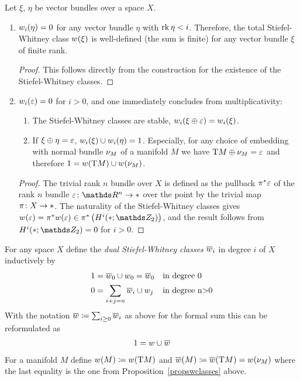 \begin{Rem} %
  \label{propswclasses}
  Let $\xi$, $\eta$ be vector bundles over a space $X$.
  \begin{enumerate} 
  \item $w_i(\eta) = 0$
    for any vector bundle $\eta$ with $\operatorname{rk}\eta < i$.
    Therefore, the total Stiefel-Whitney class $w(\xi)$ is
    well-defined (\idest the sum is finite)
    for any vector bundle $\xi$ of finite rank.
    \begin{proof}
      This follows directly from the construction for the existence of
      the Stiefel-Whitney classes.
    \end{proof}
  \item $w_i(\varepsilon)=0$ for $i>0$, and one immediately concludes
    from multiplicativity:
    \begin{enumerate}
    \item The Stiefel-Whitney classes are stable, \idest
      $w_i(\xi\oplus\varepsilon) = w_i(\xi)$.
    \item\label{wuclassmfdinverse}
      If $\xi\oplus\eta = \varepsilon$, $w_i(\xi)\cup w_i(\eta)=1$.
      Especially, for any choice of embedding with normal bundle $\nu_{M}$
      of a manifold $M$ we have $\mathrm{T}M \oplus \nu_{M} = \varepsilon$ and
      therefore $1 = w(\mathrm{T}M) \cup w(\nu_{M})$.
    \end{enumerate}
    \begin{proof} %
      The trivial rank $n$ bundle over $X$ is defined as the pullback
      ${\pi}^* \varepsilon$ of the rank $n$ bundle
      $\trivbdl\colon \R^n\to\pt$ over the point by the trivial map
      $\pi\colon X\to*$. The naturality of the Stiefel-Whitney
      classes gives $\w(\trivbdl) = \pb\pi \w(\trivbdl)
      \in\pb\pi \left(H^i(\pt;\Zmod2)\right)$,
      and the result follows from $H^i(\pt;\Zmod2) = 0$ for $i>0$.
    \end{proof}
  \end{enumerate}
\end{Rem}

\begin{Def}
  For any space $X$ define the \emph{dual Stiefel-Whitney classes}
  $\overline{w}_i$ in degree $i$ of $X$ inductively by
  \begin{align*}
    1 &= \overline{w}_0\cup w_0 = \overline{w}_0    &&\text{in degree 0}\\
    0 &= \sum_{i+j=n} \overline{w}_i\cup w_j  &&\text{in degree n>0}
  \end{align*}
  With the notation $\overline{w}\coloneqq \sum_{i\geq0} \overline{w}_i$ as above
  for the formal sum this can be reformulated as
  \begin{gather*}
    1 = w\cup\overline{w}
  \end{gather*}
  For a manifold $M$ define
  $w(M) \coloneqq w(\mathrm{T}M)$ and
  $\overline{w}(M) \coloneqq \overline{w}(\mathrm{T}M) = w(\nu_{M})$
  where the last equality is the one from
  Proposition~\ref{propswclasses} above.
\end{Def}

